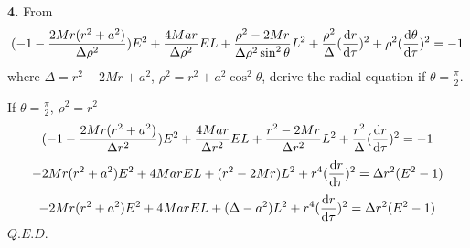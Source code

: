 \documentclass{article}
\begin{document}
{\bf4.}\quad
From
$$(-1-\frac{2Mr(r^2+a^2)}{\Delta\rho^2})E^2+\frac{4Mar}{\Delta\rho^2}EL+\frac{\rho^2-2Mr}{\Delta\rho^2\sin^2\theta}L^2+\frac{\rho^2}{\Delta}(\dv{r}{\tau})^2+\rho^2(\dv{\theta}{\tau})^2=-1$$
where $\Delta=r^2-2Mr+a^2$, $\rho^2=r^2+a^2\cos^2\theta$, derive the radial equation if $\theta=\frac{\pi}{2}$.

If $\theta=\frac{\pi}{2}$, $\rho^2=r^2$
$$(-1-\frac{2Mr(r^2+a^2)}{\Delta r^2})E^2+\frac{4Mar}{\Delta r^2}EL+\frac{r^2-2Mr}{\Delta r^2}L^2+\frac{r^2}{\Delta}(\dv{r}{\tau})^2=-1$$
$$-2Mr(r^2+a^2)E^2+4MarEL+(r^2-2Mr)L^2+r^4(\dv{r}{\tau})^2=\Delta r^2(E^2-1)$$
$$-2Mr(r^2+a^2)E^2+4MarEL+(\Delta-a^2)L^2+r^4(\dv{r}{\tau})^2=\Delta r^2(E^2-1)$$
  \qquad\qquad\qquad\qquad\qquad\qquad\qquad\qquad\qquad\qquad\qquad\qquad\qquad\qquad\qquad\qquad\qquad\qquad\qquad\qquad\qquad\qquad\qquad$Q.E.D.$
\end{document}
